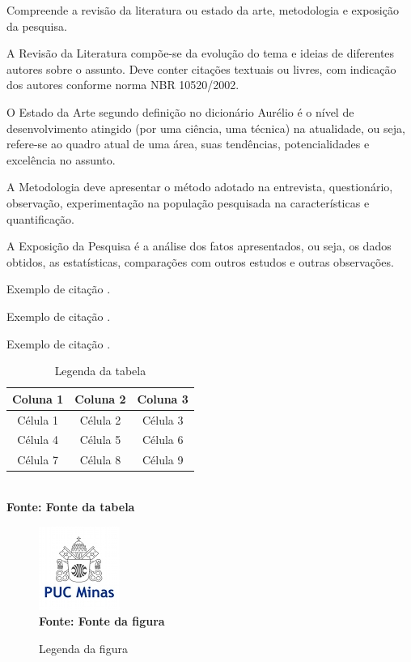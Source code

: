 \iniciocapitulo
Compreende a revisão da literatura ou estado da arte, metodologia e exposição da pesquisa.\par

A Revisão da Literatura compõe-se da evolução do tema e ideias de diferentes autores sobre o assunto. Deve conter citações textuais ou livres, com indicação dos autores conforme norma NBR 10520/2002.\par

O Estado da Arte segundo definição no dicionário Aurélio é o nível de desenvolvimento atingido (por uma ciência, uma técnica) na atualidade, ou seja, refere-se ao quadro atual de uma área, suas tendências, potencialidades e excelência no assunto.\par

A Metodologia deve apresentar o método adotado na entrevista, questionário, observação, experimentação na população pesquisada na características e quantificação.\par

A Exposição da Pesquisa é a análise dos fatos apresentados, ou seja, os dados obtidos, as estatísticas, comparações com outros estudos e outras observações.\par


Exemplo de citação \cite{knuth68}.

Exemplo de citação \cite{knuth69}.

Exemplo de citação \cite{knuth73}.




\begin{table}[!htb]
	\caption[Descrição na Lista de Tabelas]{Legenda da tabela}
	\centering
	\label{tab:tabela}
	\begin{tabular}{c|c|c}
		\hline
		Coluna 1 & Coluna 2 & Coluna 3 \\
		\hline
 		Célula 1 & Célula 2 & Célula 3 \\
		Célula 4 & Célula 5 & Célula 6 \\
		Célula 7 & Célula 8 & Célula 9 \\
		\hline
	\end{tabular}
	\\ \textbf{\footnotesize Fonte: Fonte da tabela}
\end{table}


\begin{figure}[!htb]
   \caption[Descrição na Lista de Figuras]{Legenda da figura}
   \label{fig:figura1}
   \centering
   \includegraphics{LogoPUC.jpg}
   \\ \textbf{\footnotesize Fonte: Fonte da figura}
\end{figure}


